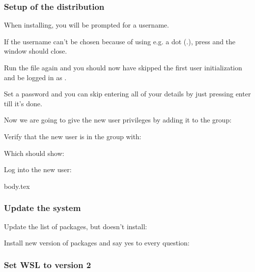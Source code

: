 \subsubsection{Setup of the distribution}

When installing, you will be prompted for a username.


If the username can't be chosen because of using e.g. a dot (.), press  and the window should close.

Run the  file again and you should now have skipped the first user initialization and be logged in as .


Set a password and you can skip entering all of your details by just pressing enter till it's done.

Now we are going to give the new user  privileges by adding it to the  group:


Verify that the new user is in the  group with: 

Which should show: 

Log into the new user:


\ifdefined\wslDistroSetupDefaultUser
{body.tex}
\fi


\subsubsection{Update the system}

Update the list of packages, but doesn't install:


Install new version of packages and say yes to every question:



\subsubsection{Set WSL to version 2}

